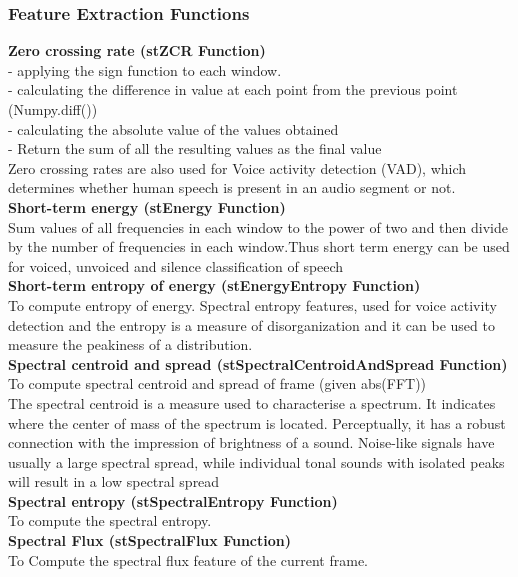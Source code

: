 \documentclass[10pt]{article}
\begin{document}
\subsubsection{\textbf{\normalsize Feature Extraction Functions }}
\textbf{Zero crossing rate (stZCR Function)}\\
- applying the sign function to each window.\\
- calculating the difference in value at each point from the previous point (Numpy.diff())\\
- calculating the absolute value of the values obtained\\
- Return the sum of all the resulting values as the final value\\
Zero crossing rates are also used for Voice activity detection (VAD), which determines whether human speech is present in an audio segment or not.\\
\textbf{Short-term energy (stEnergy Function)}\\
Sum values of all frequencies in each window to the power of two and then divide by the number of frequencies in each window.Thus short term energy can be used for voiced, unvoiced and silence classification of speech\\
\textbf{Short-term entropy of energy (stEnergyEntropy Function)}\\
To compute entropy of energy. Spectral entropy features, used for voice activity detection and the entropy is a measure of disorganization and it can be used to measure the peakiness of a distribution.\\
\textbf{Spectral centroid and spread (stSpectralCentroidAndSpread Function)}\\
To compute spectral centroid and spread of frame (given abs(FFT))\\
The spectral centroid is a measure used to characterise a spectrum. It indicates where the center of mass of the spectrum is located. Perceptually, it has a robust connection with the impression of brightness of a sound. Noise-like signals have usually a large spectral spread, while individual tonal sounds with isolated peaks will result in a low spectral spread\\
\textbf{Spectral entropy (stSpectralEntropy Function)}\\
To compute the spectral entropy.\\
\textbf{Spectral Flux (stSpectralFlux Function)}\\
To Compute the spectral flux feature of the current frame.\\
\end{document}
